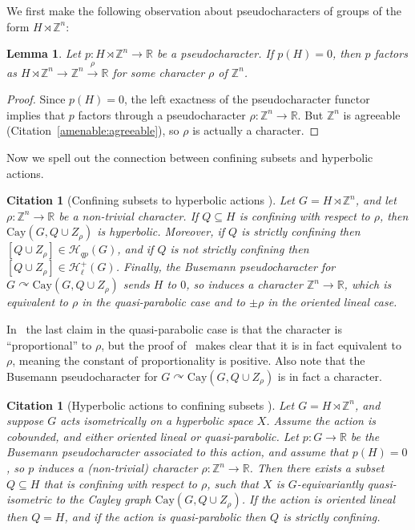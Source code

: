 \documentclass[10pt,a4paper]{article}
\newtheorem{lemm}[cdrthm]{Lemma}
\theoremstyle{definition}
\theoremstyle{remark}
\newcommand{\Z}{\mathbb{Z}}
\newcommand{\R}{\mathbb{R}}
\newcommand{\Hyp}{\mathcal{H}}
\newcommand{\Cay}{\mathrm{Cay}}
\theoremstyle{plain}
\newtheorem{cit}[cdrthm]{Citation}
\begin{document}
We first make the following observation about pseudocharacters of groups of the form $H \rtimes \Z^n$:

\begin{lemm}
\label{lem:factor}
Let $p \colon H \rtimes \Z^n \to \R$ be a pseudocharacter. If $p(H) = 0$, then $p$ factors as $H \rtimes \Z^n \to \Z^n \xrightarrow{\rho} \R$ for some character $\rho$ of $\Z^n$.
\end{lemm}

\begin{proof}
Since $p(H) = 0$, the left exactness of the pseudocharacter functor~\cite[Remark 2.90]{scl} implies that $p$ factors through a pseudocharacter $\rho \colon \Z^n \to \R$. But $\Z^n$ is agreeable (Citation~\ref{amenable:agreeable}), so $\rho$ is actually a character.
\end{proof}

Now we spell out the connection between confining subsets and hyperbolic actions.

\begin{cit}[Confining subsets to hyperbolic actions {\cite[Theorem~1.1]{confining}}]\label{cit:confining_to_action}
Let $G=H\rtimes \Z^n$, and let $\rho\colon \Z^n\to \R$ be a non-trivial character. If $Q\subseteq H$ is confining with respect to $\rho$, then $\Cay(G,Q\cup Z_\rho)$ is hyperbolic. Moreover, if $Q$ is strictly confining then $[Q\cup Z_\rho]\in \Hyp_{qp}(G)$, and if $Q$ is not strictly confining then $[Q\cup Z_\rho]\in \Hyp_\ell^+(G)$. Finally, the Busemann pseudocharacter for $G\curvearrowright \Cay(G,Q\cup Z_\rho)$ sends $H$ to $0$, so induces a character $\Z^n\to\R$, which is equivalent to $\rho$ in the quasi-parabolic case and to $\pm\rho$ in the oriented lineal case.
\end{cit}

In~\cite[Theorem~1.1]{confining} the last claim in the quasi-parabolic case is that the character is ``proportional'' to $\rho$, but the proof of~\cite[Lemma~1.1]{confining} makes clear that it is in fact equivalent to $\rho$, meaning the constant of proportionality is positive. Also note that the Busemann pseudocharacter for $G\curvearrowright \Cay(G,Q\cup Z_\rho)$ is in fact a character.

\begin{cit}[Hyperbolic actions to confining subsets {\cite[Theorem~3.17]{confining}}]
\label{cit:action_to_confining}
Let $G=H\rtimes \Z^n$, and suppose $G$ acts isometrically on a hyperbolic space $X$. Assume the action is cobounded, and either oriented lineal or quasi-parabolic. Let $p\colon G\to\R$ be the Busemann pseudocharacter associated to this action, and assume that $p(H)=0$, so $p$ induces a (non-trivial) character $\rho\colon \Z^n\to\R$. Then there exists a subset $Q\subseteq H$ that is confining with respect to $\rho$, such that $X$ is $G$-equivariantly quasi-isometric to the Cayley graph $\Cay(G,Q\cup Z_\rho)$. If the action is oriented lineal then $Q=H$, and if the action is quasi-parabolic then $Q$ is strictly confining.
\end{cit}
\end{document}
